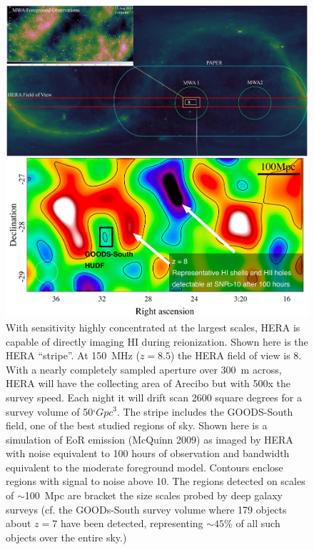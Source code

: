 \documentclass[preprint]{aastex}
\begin{document}

\begin{figure}[!ht]\centering
\includegraphics[width=\textwidth]{plots/Imaging/HERA_FoV_and_sim.jpg}%
\caption{\small
With sensitivity highly concentrated at the largest scales, HERA is capable of directly imaging HI during reionization.  Shown here is the HERA ``stripe''.  At 150~MHz ($z=8.5$) the HERA field of view is 8\arcdeg.  With a nearly completely sampled aperture over 300~m across, HERA will have the collecting area of Arecibo but with 500x the survey speed. Each night it will drift scan 2600 square degrees for a survey volume of 50`$Gpc^3$.  The stripe includes the GOODS-South field, one of the best studied regions of sky.  Shown here is a simulation of EoR emission (McQuinn 2009) as imaged by HERA with noise equivalent to 100 hours of observation and bandwidth equivalent to the moderate foreground model. %
Contours enclose regions with signal to noise above 10.  The regions detected on scales of $\sim$100~Mpc are bracket the size scales probed by deep galaxy surveys (cf. the GOODs-South survey volume where 179 objects about $z=7$ have been detected, representing $\sim45\%$ of all such objects over the entire sky.)  \label{fig:imaging}}
\end{figure}    
\end{document}
